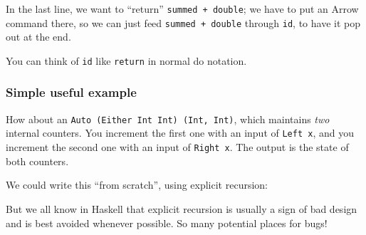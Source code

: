 \documentclass[]{article}
\newenvironment{Shaded}{}{}
\newcommand{\CommentTok}[1]{\textcolor[rgb]{0.38,0.63,0.69}{\textit{#1}}}
\newcommand{\DataTypeTok}[1]{\textcolor[rgb]{0.56,0.13,0.00}{#1}}
\newcommand{\DecValTok}[1]{\textcolor[rgb]{0.25,0.63,0.44}{#1}}
\newcommand{\KeywordTok}[1]{\textcolor[rgb]{0.00,0.44,0.13}{\textbf{#1}}}
\newcommand{\NormalTok}[1]{#1}
\newcommand{\OperatorTok}[1]{\textcolor[rgb]{0.40,0.40,0.40}{#1}}
\newcommand{\OtherTok}[1]{\textcolor[rgb]{0.00,0.44,0.13}{#1}}
\begin{document}
In the last line, we want to ``return'' \texttt{summed\ +\ double}; we have to
put an Arrow command there, so we can just feed \texttt{summed\ +\ double}
through \texttt{id}, to have it pop out at the end.

You can think of \texttt{id} like \texttt{return} in normal do notation.

\subsubsection{Simple useful example}\label{simple-useful-example}

How about an \texttt{Auto\ (Either\ Int\ Int)\ (Int,\ Int)}, which maintains
\emph{two} internal counters. You increment the first one with an input of
\texttt{Left\ x}, and you increment the second one with an input of
\texttt{Right\ x}. The output is the state of both counters.

We could write this ``from scratch'', using explicit recursion:

\begin{Shaded}
\end{Shaded}

But we all know in Haskell that explicit recursion is usually a sign of bad
design and is best avoided whenever possible. So many potential places for bugs!
\end{document}

